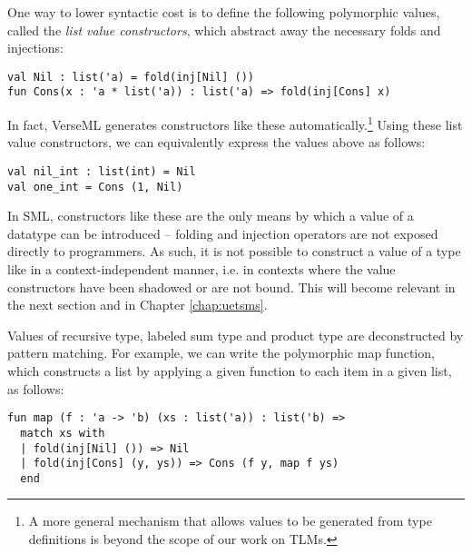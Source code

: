 One way to lower syntactic cost is to define the following polymorphic values, called the \emph{list value constructors}, which abstract away the necessary folds and injections:
\begin{lstlisting}[numbers=none]
val Nil : list('a) = fold(inj[Nil] ())
fun Cons(x : 'a * list('a)) : list('a) => fold(inj[Cons] x)
\end{lstlisting}
In fact, VerseML generates constructors like these automatically.\footnote{A more general mechanism that allows values to be generated from type definitions is beyond the scope of our work on TLMs.} 
Using these list value constructors, we can equivalently express the values above as follows:
\begin{lstlisting}[numbers=none]
val nil_int : list(int) = Nil
val one_int = Cons (1, Nil)
\end{lstlisting}
In SML, constructors like these are the only means by which a value of a datatype can be introduced -- folding and injection operators are not exposed directly to programmers. As such, it is not possible to construct a value of a type like  in a context-independent manner, i.e. in contexts where the value constructors have been shadowed or are not bound. This will become relevant in the next section and in Chapter \ref{chap:uetsms}. %

Values of recursive type, labeled sum type and product type are deconstructed by pattern matching. %
For example, we can write the polymorphic map function, which constructs a  list by applying a given function to each item in a given list, as follows:
\begin{lstlisting}[numbers=none]
fun map (f : 'a -> 'b) (xs : list('a)) : list('b) => 
  match xs with 
  | fold(inj[Nil] ()) => Nil
  | fold(inj[Cons] (y, ys)) => Cons (f y, map f ys)
  end
\end{lstlisting}


